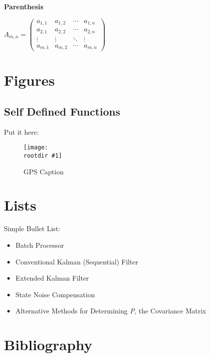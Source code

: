 \documentclass[11pt,a4paper,oneside]{article}
\newcommand{\rootdir}{./Figures/}
\newcommand{\fig}[3]{
			\begin{center}
				\begin{figure}[H]
					\texttt{[image: \\rootdir \#1]}
					\caption{#2}
					\label{#3}
				\end{figure}
			\end{center}
			}
\begin{document}
\noindent \bf{Parenthesis}
	\begin{center}
	$
		A_{m,n} =
		 \begin{pmatrix}
		  a_{1,1} & a_{1,2} & \cdots & a_{1,n} \\
		  a_{2,1} & a_{2,2} & \cdots & a_{2,n} \\
		  \vdots  & \vdots  & \ddots & \vdots  \\
		  a_{m,1} & a_{m,2} & \cdots & a_{m,n}
		 \end{pmatrix}
	$
\end{center}



\section{Figures}
\subsection{Self Defined Functions}
Put it here:
\fig{GPS.jpg}{GPS Caption \cite{GPS}}{GPS Label}



\section{Lists}
Simple Bullet List:
\begin{itemize}
	\renewcommand{\labelitemi}{$\bullet$}
	\item Batch Processor
	\item Conventional Kalman (Sequential) Filter
	\item Extended Kalman Filter
	\item State Noise Compensation
	\item Alternative Methods for Determining \emph{P}, the Covariance Matrix
\end{itemize}




\newpage
\section{Bibliography}
\end{document}
